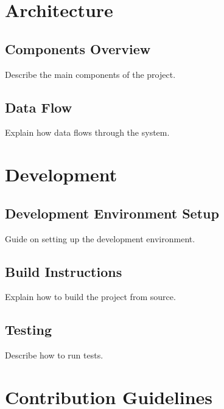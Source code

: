 \documentclass[letterpaper,10pt,english]{sphinxmanual}
\begin{document}
\sphinxstepscope


\chapter{Architecture}
\label{\detokenize{architecture:architecture}}\label{\detokenize{architecture::doc}}

\section{Components Overview}
\label{\detokenize{architecture:components-overview}}
\sphinxAtStartPar
Describe the main components of the project.


\section{Data Flow}
\label{\detokenize{architecture:data-flow}}
\sphinxAtStartPar
Explain how data flows through the system.

\sphinxstepscope


\chapter{Development}
\label{\detokenize{development:development}}\label{\detokenize{development::doc}}

\section{Development Environment Setup}
\label{\detokenize{development:development-environment-setup}}
\sphinxAtStartPar
Guide on setting up the development environment.


\section{Build Instructions}
\label{\detokenize{development:build-instructions}}
\sphinxAtStartPar
Explain how to build the project from source.


\section{Testing}
\label{\detokenize{development:testing}}
\sphinxAtStartPar
Describe how to run tests.

\sphinxstepscope


\chapter{Contribution Guidelines}
\label{\detokenize{contribution_guidelines:contribution-guidelines}}\label{\detokenize{contribution_guidelines::doc}}
\end{document}
